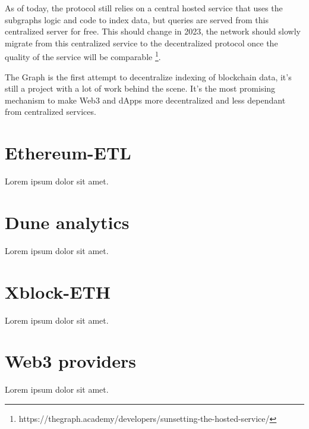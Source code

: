 As of today, the protocol still relies on a central hosted service that uses the subgraphs logic and code to index data, but queries are served from this centralized server for free. This should change in 2023, the network should slowly migrate from this centralized service to the decentralized protocol once the quality of the service will be comparable \footnote{https://thegraph.academy/developers/sunsetting-the-hosted-service/}.

The Graph is the first attempt to decentralize indexing of blockchain data, it's still a project with a lot of work behind the scene. It's the most promising mechanism to make Web3 and dApps more decentralized and less dependant from centralized services. 


\section{Ethereum-ETL}

Lorem ipsum dolor sit amet.

\section{Dune analytics}

Lorem ipsum dolor sit amet.

\section{Xblock-ETH}

Lorem ipsum dolor sit amet.

\section{Web3 providers}

Lorem ipsum dolor sit amet.
